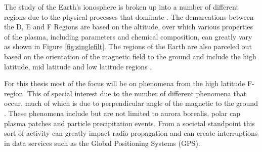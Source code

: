 %
% 
%

The study of the Earth's ionosphere is broken up into a number of different regions due to the physical processes that dominate \cite{kellybook}. The demarcations between the D, E and F Regions are based on the altitude, over which various properties of the plasma, including parameters and chemical composition, can greatly vary as shown in Figure \ref{fig:singlefilt}. The regions of the Earth are also parceled out based on the orientation of the magnetic field to the ground and include the high latitude, mid latitude and low latitude regions \cite{schunk2004ionospheres}.

For this thesis most of the focus will be on phenomena from the high latitude F-region. This of special interest due to the number of different phenomena that occur, much of which is due to perpendicular angle of the magnetic to the ground \cite{schunk2004ionospheres}. These phenomena include but are not limited to aurora borealis, polar cap plasma patches and particle precipitation events\cite{Perry:2015jf,Dahlgren:2013ip,dahlgren2012di,Dahlgren:2012dq,semeter:plasmatransport2012}. From a societal standpoint this sort of activity can greatly impact radio propagation and can create interruptions in data services such as the Global Positioning Systems (GPS)\cite{Jiao:2013ei,hunsucker2007high}.


